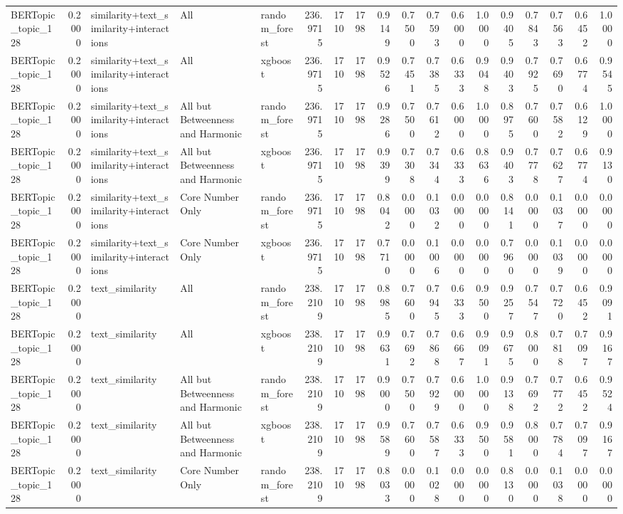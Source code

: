 \begin{tabular}{lrlllrrrrrrrrrrrrr}
BERTopic_topic_128 & 0.2000 & similarity+text_similarity+interactions & All & random_forest & 236.9715 & 1710 & 1798 & 0.9149 & 0.7500 & 0.7593 & 0.6000 & 1.0000 & 0.9405 & 0.7843 & 0.7563 & 0.6452 & 1.0000 \\
BERTopic_topic_128 & 0.2000 & similarity+text_similarity+interactions & All & xgboost & 236.9715 & 1710 & 1798 & 0.9526 & 0.7451 & 0.7385 & 0.6333 & 0.9048 & 0.9403 & 0.7925 & 0.7690 & 0.6774 & 0.9545 \\
BERTopic_topic_128 & 0.2000 & similarity+text_similarity+interactions & All but Betweenness and Harmonic & random_forest & 236.9715 & 1710 & 1798 & 0.9286 & 0.7500 & 0.7612 & 0.6000 & 1.0000 & 0.8975 & 0.7600 & 0.7582 & 0.6129 & 1.0000 \\
BERTopic_topic_128 & 0.2000 & similarity+text_similarity+interactions & All but Betweenness and Harmonic & xgboost & 236.9715 & 1710 & 1798 & 0.9399 & 0.7308 & 0.7344 & 0.6333 & 0.8636 & 0.9403 & 0.7778 & 0.7627 & 0.6774 & 0.9130 \\
BERTopic_topic_128 & 0.2000 & similarity+text_similarity+interactions & Core Number Only & random_forest & 236.9715 & 1710 & 1798 & 0.8042 & 0.0000 & 0.1032 & 0.0000 & 0.0000 & 0.8141 & 0.0000 & 0.1037 & 0.0000 & 0.0000 \\
BERTopic_topic_128 & 0.2000 & similarity+text_similarity+interactions & Core Number Only & xgboost & 236.9715 & 1710 & 1798 & 0.7710 & 0.0000 & 0.1006 & 0.0000 & 0.0000 & 0.7960 & 0.0000 & 0.1039 & 0.0000 & 0.0000 \\
BERTopic_topic_128 & 0.2000 & text_similarity & All & random_forest & 238.2109 & 1710 & 1798 & 0.8985 & 0.7600 & 0.7945 & 0.6333 & 0.9500 & 0.9257 & 0.7547 & 0.7720 & 0.6452 & 0.9091 \\
BERTopic_topic_128 & 0.2000 & text_similarity & All & xgboost & 238.2109 & 1710 & 1798 & 0.9631 & 0.7692 & 0.7868 & 0.6667 & 0.9091 & 0.9675 & 0.8000 & 0.7818 & 0.7097 & 0.9167 \\
BERTopic_topic_128 & 0.2000 & text_similarity & All but Betweenness and Harmonic & random_forest & 238.2109 & 1710 & 1798 & 0.9000 & 0.7500 & 0.7929 & 0.6000 & 1.0000 & 0.9138 & 0.7692 & 0.7772 & 0.6452 & 0.9524 \\
BERTopic_topic_128 & 0.2000 & text_similarity & All but Betweenness and Harmonic & xgboost & 238.2109 & 1710 & 1798 & 0.9589 & 0.7600 & 0.7587 & 0.6333 & 0.9500 & 0.9581 & 0.8000 & 0.7784 & 0.7097 & 0.9167 \\
BERTopic_topic_128 & 0.2000 & text_similarity & Core Number Only & random_forest & 238.2109 & 1710 & 1798 & 0.8033 & 0.0000 & 0.1028 & 0.0000 & 0.0000 & 0.8130 & 0.0000 & 0.1038 & 0.0000 & 0.0000 \\

\end{tabular}
